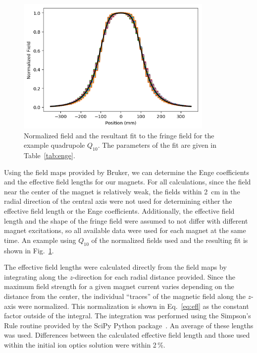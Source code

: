 \begin{figure}[t]
    \begin{center}
        \centerline{
            \includegraphics[width=0.85\textwidth]{figures/enge_fit.png}}
        \caption[Normalized field with Enge fit]{Normalized field and
            the resultant fit to the fringe field for the example
            quadrupole $Q_{10}$. The parameters of the fit are given in
            Table~\ref{tab:enge}.}
        \label{fig:enge_fit}
    \end{center}
\end{figure}

Using the field maps provided by Bruker, we can determine the Enge
coefficients and the effective field lengths for our magnets. For all
calculations, since the field near the center of the magnet is
relatively weak, the fields within 2~cm in the radial direction of the
central axis were not used for determining either the effective field
length or the Enge coefficients. Additionally, the effective field
length and the shape of the fringe field were assumed to not differ with
different magnet excitations, so all available data were used for each
magnet at the same time. An example using $Q_{10}$ of the normalized
fields used and the resulting fit is shown in Fig.~\ref{fig:enge_fit}.

The effective field lengths were calculated directly from the field maps
by integrating along the $z$-direction for each radial distance
provided. Since the maximum field strength for a given magnet current
varies depending on the distance from the center, the individual
``traces'' of the magnetic field along the $z$-axis were normalized.
This normalization is shown in Eq.~\ref{eq:efl} as the constant factor
outside of the integral. The integration was performed using the
Simpson's Rule routine provided by the SciPy Python
package~\cite{SciPy}. An average of these lengths was used. Differences
between the calculated effective field length and those used within the
initial ion optics solution were within 2\,\%.

